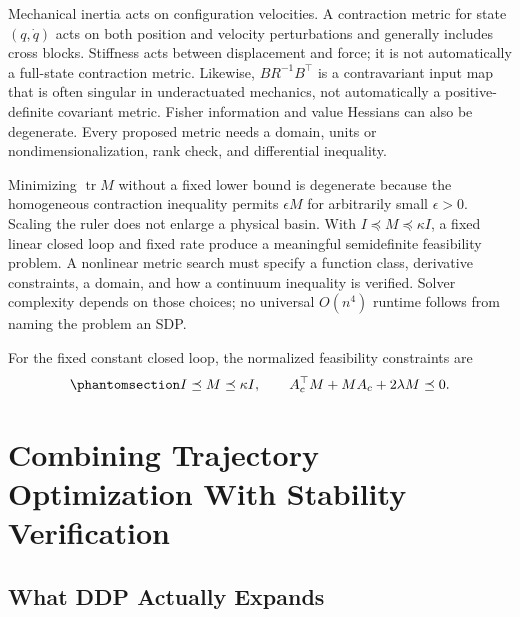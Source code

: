 \documentclass[
  10pt,
  letterpaper,
  DIV=11,
  numbers=noendperiod]{scrartcl}
\begin{document}
Mechanical inertia acts on configuration velocities. A contraction
metric for state \((q,\dot q)\) acts on both position and velocity
perturbations and generally includes cross blocks. Stiffness acts
between displacement and force; it is not automatically a full-state
contraction metric. Likewise, \(BR^{-1}B^\top\) is a contravariant input
map that is often singular in underactuated mechanics, not automatically
a positive-definite covariant metric. Fisher information and value
Hessians can also be degenerate. Every proposed metric needs a domain,
units or nondimensionalization, rank check, and differential inequality.

Minimizing \(\operatorname{tr}M\) without a fixed lower bound is
degenerate because the homogeneous contraction inequality permits
\(\epsilon M\) for arbitrarily small \(\epsilon>0\). Scaling the ruler
does not enlarge a physical basin. With \(I\preceq M\preceq\kappa I\), a
fixed linear closed loop and fixed rate produce a meaningful
semidefinite feasibility problem. A nonlinear metric search must specify
a function class, derivative constraints, a domain, and how a continuum
inequality is verified. Solver complexity depends on those choices; no
universal \(O(n^4)\) runtime follows from naming the problem an SDP.

For the fixed constant closed loop, the normalized feasibility
constraints are
\begin{equation}\phantomsection\label{eq-contraction-lmi}{
I\preceq M\preceq\kappa I,\qquad A_c^\top M+MA_c+2\lambda M\preceq0.
}\end{equation}

\section{Combining Trajectory Optimization With Stability
Verification}\label{combining-trajectory-optimization-with-stability-verification}

\subsection{What DDP Actually Expands}\label{what-ddp-actually-expands}
\end{document}

